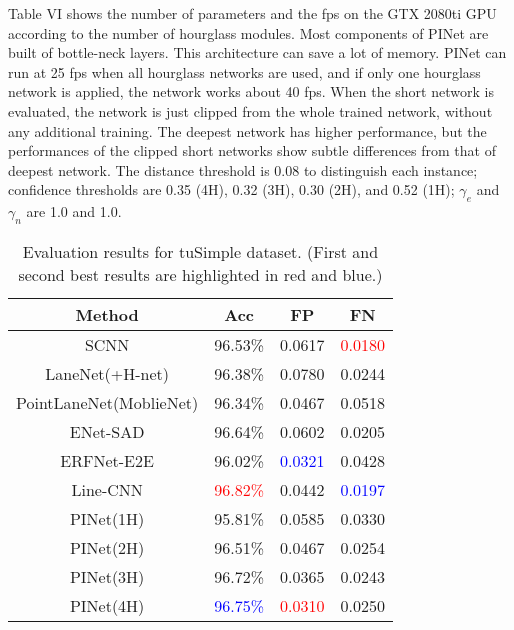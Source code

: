 \documentclass[journal]{IEEEtran}
\begin{document}
Table VI shows the number of parameters and the fps on the GTX 2080ti GPU according to the number of hourglass modules. Most components of PINet are built of bottle-neck layers. This architecture can save a lot of memory. PINet can run at 25 fps when all hourglass networks are used, and if only one hourglass network is applied, the network works about 40 fps. When the short network is evaluated, the network is just clipped from the whole trained network, without any additional training. The deepest network has higher performance, but the performances of the clipped short networks show subtle differences from that of deepest network. The distance threshold is 0.08 to distinguish each instance; confidence thresholds are 0.35 (4H), 0.32 (3H), 0.30 (2H), and 0.52 (1H); $\gamma_e$ and $\gamma_n$ are 1.0 and 1.0. 

\begin{table}[ht]
    \caption{Evaluation results for tuSimple dataset. \newline(First and second best results are highlighted in red and blue.)}
    \begin{center}
        \begin{tabular}{|c|c|c|c|}
            \hline
            Method & Acc & FP & FN\\
            \hline
            \hline
            SCNN \cite{pan2018spatial} & 96.53\% & 0.0617 & \textcolor{red}{0.0180}\\
            \hline
            LaneNet(+H-net) \cite{neven2018towards} & 96.38\% & 0.0780 & 0.0244\\
            \hline
            PointLaneNet(MoblieNet)\cite{chen2019pointlanenet} & 96.34\% & 0.0467 & 0.0518\\
            \hline
            ENet-SAD\cite{hou2019learning} & 96.64\% & 0.0602 & 0.0205\\
            \hline
            ERFNet-E2E \cite{yoo2020end} & 96.02\% & \textcolor{blue}{0.0321} & 0.0428\\
            \hline
            Line-CNN \cite{8624563} & \textcolor{red}{96.82\%} & 0.0442 & \textcolor{blue}{0.0197}\\
            \hline
            \hline
            PINet(1H) & 95.81\% & 0.0585 & 0.0330\\
            \hline
            PINet(2H) & 96.51\% & 0.0467 & 0.0254 \\
            \hline
            PINet(3H)& 96.72\%  & 0.0365 &  0.0243\\
            \hline
            PINet(4H)& \textcolor{blue}{96.75\%}  & \textcolor{red}{0.0310} &  0.0250\\
            \hline
        \end{tabular}
    \end{center}
\end{table}
\end{document}
